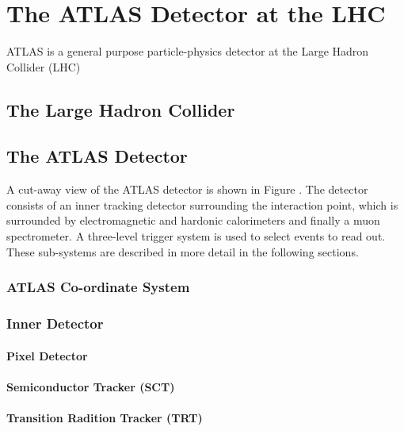 \graphicspath{{Chapters/Detector/Figures/}}
\chapter{The ATLAS Detector at the LHC}
\label{chap:Detector}

ATLAS is a general purpose particle-physics detector at the Large Hadron
Collider (LHC)

\section{The Large Hadron Collider}

\section{The ATLAS Detector}

A cut-away view of the ATLAS detector is shown in Figure . The detector consists
of an inner tracking detector surrounding the interaction point, which is
surrounded by electromagnetic and hardonic calorimeters and finally a muon
spectrometer. A three-level trigger system is used to select events to read out.
These sub-systems are described in more detail in the following
sections. 

\subsection{ATLAS Co-ordinate System}

\subsection{Inner Detector}

\subsubsection{Pixel Detector}
\subsubsection{Semiconductor Tracker (SCT)}
\subsubsection{Transition Radition Tracker (TRT)}

\label{sec:Detector-SCT}

